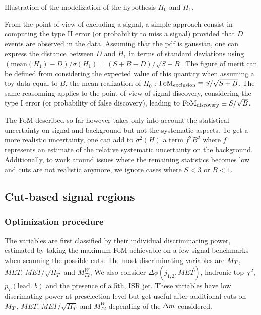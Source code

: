                          {Illustration of the modelization of the hypothesis $H_0$ and $H_1$.}

            From the point of view of excluding a signal, a simple approach consist in computing the type 
            II error (or probability to miss a signal) provided that $D$ events are observed in the
            data. Assuming that the pdf is gaussian, one can express the distance between $D$ and $H_1$ in terms 
            of standard deviations using $(\text{mean}(H_1) - D) / \sigma(H_1) = (S + B - D) / \sqrt{S+B}$.
            The figure of merit can be defined from considering the expected value of this quantity when assuming 
            a toy data equal to $B$, the mean realization of $H_0$ : $\text{FoM}_\text{exclusion} \equiv S 
            / \sqrt{S+B}$. The same reasonning applies to the point of view of signal discovery, considering 
            the type I error (or probability of false discovery), leading to $\text{FoM}_\text{discovery}
            \equiv S/\sqrt{B}$.

            The FoM described so far however takes only into account the statistical uncertainty on signal and 
            background but not the systematic aspects. To get a more realistic uncertainty, one can add to 
            $\sigma^2(H)$ a term $f^2 B^2$ where $f$ represents an estimate of the relative systematic uncertainty 
            on the background. Additionally, to work around issues where the remaining statistics becomes low and 
            cuts are not realistic anymore, we ignore cases where $S < 3$ or $B < 1$.

        \subsection{Cut-based signal regions}

            \subsubsection{Optimization procedure}

            The variables are first classified by their individual discriminating power, estimated by taking the 
            maximum FoM achievable on a few signal benchmarks when scanning the possible cuts. The most 
            discriminating variables are $M_T$, $MET$, $MET/\sqrt{H_T}$ and $M_{T2}^{W}$, We also consider 
            $\Delta \phi(j_{1,2},\vec{MET})$, hadronic top $\chi^2$, $p_T(\text{lead. } b)$ and the presence of a
            5th, ISR jet. These variables have low discrimating power at preselection level but get useful after
            additional cuts on $M_T$, $MET$, $MET/\sqrt{H_T}$ and $M_{T2}^W$ depending of the $\Delta m$ considered.

